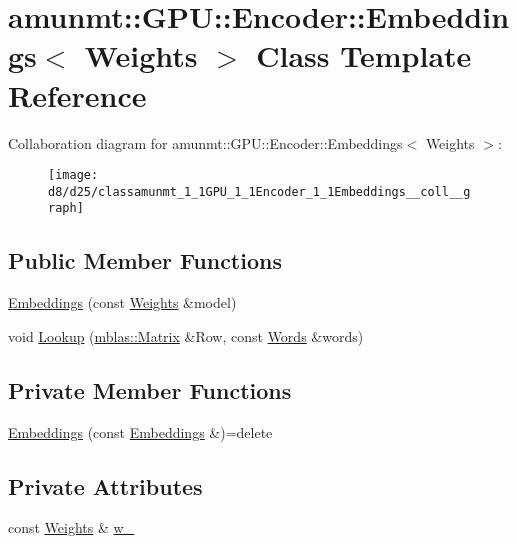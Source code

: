 \hypertarget{classamunmt_1_1GPU_1_1Encoder_1_1Embeddings}{}\section{amunmt\+:\+:G\+PU\+:\+:Encoder\+:\+:Embeddings$<$ Weights $>$ Class Template Reference}
\label{classamunmt_1_1GPU_1_1Encoder_1_1Embeddings}


Collaboration diagram for amunmt\+:\+:G\+PU\+:\+:Encoder\+:\+:Embeddings$<$ Weights $>$\+:
\nopagebreak
\begin{figure}[H]
\begin{center}
\leavevmode
\texttt{[image: d8/d25/classamunmt\_1\_1GPU\_1\_1Encoder\_1\_1Embeddings\_\_coll\_\_graph]}
\end{center}
\end{figure}
\subsection*{Public Member Functions}
\begin{DoxyCompactItemize}
\item 
\hyperlink{classamunmt_1_1GPU_1_1Encoder_1_1Embeddings_a3db8a8514e670fbc7b3c9a2b5dc236fc}{Embeddings} (const \hyperlink{structamunmt_1_1GPU_1_1Weights}{Weights} \&model)
\item 
void \hyperlink{classamunmt_1_1GPU_1_1Encoder_1_1Embeddings_a8cb9331defa2af0c29d42a776b2b574b}{Lookup} (\hyperlink{namespaceamunmt_1_1GPU_1_1mblas_ab67821a8254de53e45a623cf73c0aef6}{mblas\+::\+Matrix} \&Row, const \hyperlink{namespaceamunmt_aa50d0b3a5ba58ba5da8a4d88ddab1b18}{Words} \&words)
\end{DoxyCompactItemize}
\subsection*{Private Member Functions}
\begin{DoxyCompactItemize}
\item 
\hyperlink{classamunmt_1_1GPU_1_1Encoder_1_1Embeddings_ab3ad5a86c18939f8ebbcc05d178b020a}{Embeddings} (const \hyperlink{classamunmt_1_1GPU_1_1Encoder_1_1Embeddings}{Embeddings} \&)=delete
\end{DoxyCompactItemize}
\subsection*{Private Attributes}
\begin{DoxyCompactItemize}
\item 
const \hyperlink{structamunmt_1_1GPU_1_1Weights}{Weights} \& \hyperlink{classamunmt_1_1GPU_1_1Encoder_1_1Embeddings_a17bf92e9d4b8683b51f28876a1f4b1eb}{w\+\_\+}
\end{DoxyCompactItemize}


